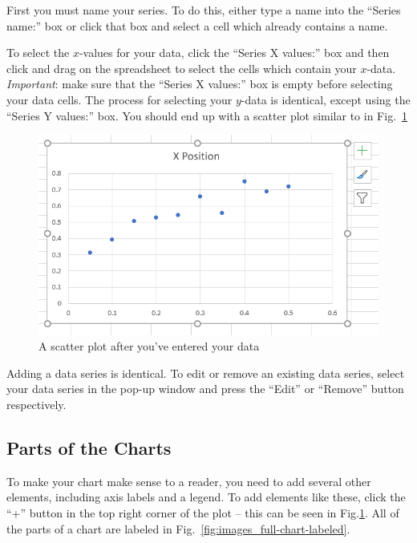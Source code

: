 \documentclass[10pt]{article}
\begin{document}
First you must name your series. To do this, either type a name into the ``Series name:'' box or click that box and select a cell which already contains a name.

To select the $x$-values for your data, click the ``Series X values:''  box and then click and drag on the spreadsheet to select the cells which contain your $x$-data. \textit{Important}: make sure that the ``Series X values:'' box is empty before selecting your data cells. The process for selecting your $y$-data is identical, except using the ``Series Y values:'' box. You should end up with a scatter plot similar to in Fig.~\ref{fig:images_plain-chart}

\begin{figure}[htpb]
	\centering
	\includegraphics[width=0.8\linewidth]{images/plain-chart.png}
	\caption{A scatter plot after you've entered your data}%
	\label{fig:images_plain-chart}
\end{figure}

Adding a data series is identical. To edit or remove an existing data series, select your data series in the pop-up window and press the ``Edit'' or ``Remove'' button respectively.

\subsection{Parts of the Charts}%
\label{sub:parts_of_the_charts}

To make your chart make sense to a reader, you need to add several other elements, including axis labels and a legend. To add elements like these, click the ``+'' button in the top right corner of the plot -- this can be seen in Fig.\ref{fig:images_plain-chart}. All of the parts of a chart are labeled in Fig.~\ref{fig:images_full-chart-labeled}. 
\end{document}
